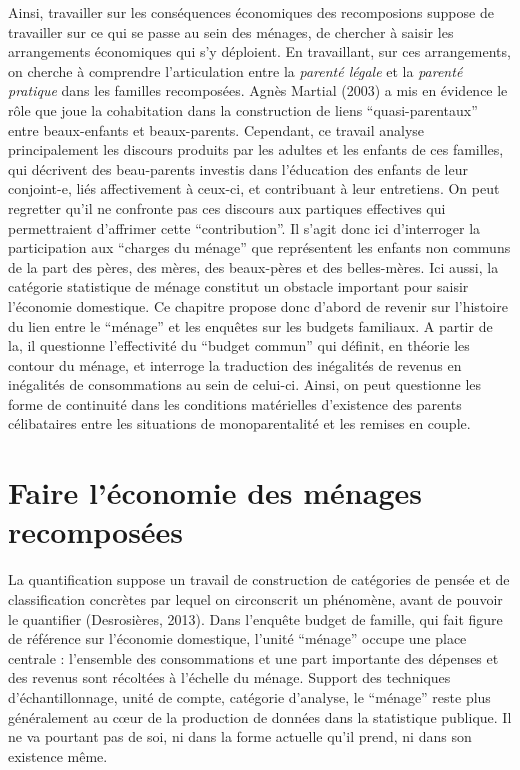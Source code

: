 \documentclass[
  12pt,
]{book}
\begin{document}
Ainsi, travailler sur les conséquences économiques des recomposions
suppose de travailler sur ce qui se passe au sein des ménages, de
chercher à saisir les arrangements économiques qui s'y déploient. En
travaillant, sur ces arrangements, on cherche à comprendre
l'articulation entre la \emph{parenté légale} et la \emph{parenté
pratique} dans les familles recomposées. Agnès Martial (2003) a mis en
évidence le rôle que joue la cohabitation dans la construction de liens
``quasi-parentaux'' entre beaux-enfants et beaux-parents. Cependant, ce
travail analyse principalement les discours produits par les adultes et
les enfants de ces familles, qui décrivent des beau-parents investis
dans l'éducation des enfants de leur conjoint-e, liés affectivement à
ceux-ci, et contribuant à leur entretiens. On peut regretter qu'il ne
confronte pas ces discours aux partiques effectives qui permettraient
d'affrimer cette ``contribution''. Il s'agit donc ici d'interroger la
participation aux ``charges du ménage'' que représentent les enfants non
communs de la part des pères, des mères, des beaux-pères et des
belles-mères. Ici aussi, la catégorie statistique de ménage constitut un
obstacle important pour saisir l'économie domestique. Ce chapitre
propose donc d'abord de revenir sur l'histoire du lien entre le
``ménage'' et les enquêtes sur les budgets familiaux. A partir de la, il
questionne l'effectivité du ``budget commun'' qui définit, en théorie
les contour du ménage, et interroge la traduction des inégalités de
revenus en inégalités de consommations au sein de celui-ci. Ainsi, on
peut questionne les forme de continuité dans les conditions matérielles
d'existence des parents célibataires entre les situations de
monoparentalité et les remises en couple.

\section{Faire l'économie des ménages
recomposées}\label{faire-luxe9conomie-des-muxe9nages-recomposuxe9es}

La quantification suppose un travail de construction de catégories de
pensée et de classification concrètes par lequel on circonscrit un
phénomène, avant de pouvoir le quantifier (Desrosières, 2013). Dans
l'enquête budget de famille, qui fait figure de référence sur l'économie
domestique, l'unité ``ménage'' occupe une place centrale : l'ensemble
des consommations et une part importante des dépenses et des revenus
sont récoltées à l'échelle du ménage. Support des techniques
d'échantillonnage, unité de compte, catégorie d'analyse, le ``ménage''
reste plus généralement au cœur de la production de données dans la
statistique publique. Il ne va pourtant pas de soi, ni dans la forme
actuelle qu'il prend, ni dans son existence même.
\end{document}
